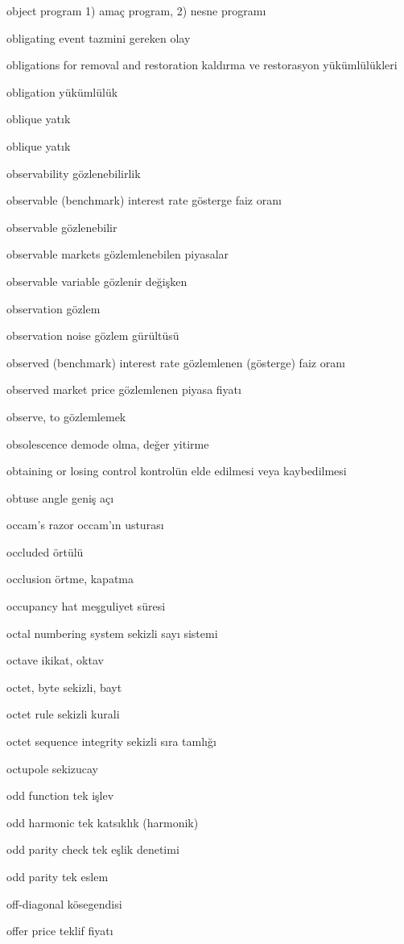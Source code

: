 \documentclass[12pt,fleqn]{article}\usepackage{../../common}
\begin{document}
object program 1) amaç program, 2) nesne programı

obligating event tazmini gereken olay

obligations for removal and restoration kaldırma ve restorasyon yükümlülükleri

obligation yükümlülük

oblique yatık

oblique yatık

observability gözlenebilirlik

observable (benchmark) interest rate gösterge faiz oranı

observable gözlenebilir

observable markets gözlemlenebilen piyasalar

observable variable gözlenir değişken

observation gözlem

observation noise gözlem gürültüsü

observed (benchmark) interest rate gözlemlenen (gösterge) faiz oranı

observed market price gözlemlenen piyasa fiyatı

observe, to gözlemlemek

obsolescence demode olma, değer yitirme

obtaining or losing control kontrolün elde edilmesi veya kaybedilmesi

obtuse angle geniş açı

occam's razor occam'ın usturası

occluded örtülü

occlusion örtme, kapatma

occupancy hat meşguliyet süresi

octal numbering system sekizli sayı sistemi

octave ikikat, oktav

octet, byte sekizli, bayt

octet rule sekizli kurali

octet sequence integrity sekizli sıra tamlığı

octupole sekizucay

odd function tek işlev

odd harmonic tek katsıklık (harmonik)

odd parity check tek eşlik denetimi

odd parity tek eslem

off-diagonal kösegendisi

offer price teklif fiyatı
\end{document}
